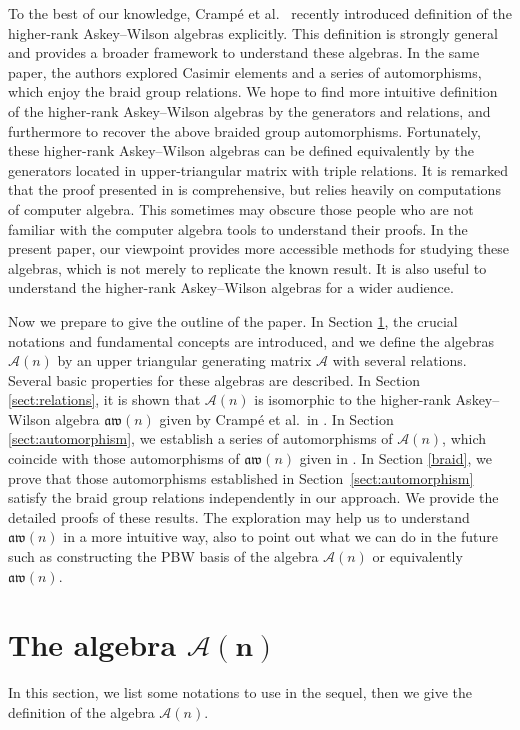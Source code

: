 \documentclass[10pt,a4paper]{amsart}
\numberwithin{equation}{section}
\def\A{\mathscr{A}}
\def\aw{\mathfrak{aw}}
\begin{document}
To the best of our knowledge, Cramp\'{e} et al.\ \cite{CFPR(2023)} recently introduced definition of the higher-rank Askey--Wilson algebras explicitly.
This definition is strongly general and provides a broader framework to understand these algebras.
In the same paper, the authors explored Casimir elements and a series of automorphisms, which enjoy the braid group relations.
We hope to find more intuitive definition of the higher-rank Askey--Wilson algebras by the generators and relations, and furthermore to recover the above braided group automorphisms.
Fortunately, these higher-rank Askey--Wilson algebras can be defined equivalently by the generators located in upper-triangular matrix with triple relations.
It is remarked that the proof presented in \cite{CFPR(2023)} is comprehensive, but relies heavily on computations of computer algebra. This sometimes may obscure those people who are not familiar with the computer algebra tools to understand their proofs.
In the present paper, our viewpoint provides more accessible methods for studying these algebras, which is not merely to replicate the known result.
It is also useful to understand the higher-rank Askey--Wilson algebras for a wider audience.

Now we prepare to give the outline of the paper.
In Section \ref{sect:notations}, the crucial notations and fundamental concepts are introduced, and we define the algebras $\A(n)$ by an upper triangular generating matrix $\A$ with several relations.
Several basic properties for these algebras are described.
In Section \ref{sect:relations}, it is shown that $\A(n)$ is isomorphic to the higher-rank Askey--Wilson algebra $\aw(n)$ given by Cramp\'{e} et al.\ in \cite{CFPR(2023)}.
In Section \ref{sect:automorphism}, we establish a series of automorphisms of $\A(n)$, which coincide with those automorphisms of $\aw(n)$ given in \cite{CFPR(2023)}.
In Section \ref{braid}, we prove that those automorphisms established in Section~\ref{sect:automorphism} satisfy the braid group relations independently in our approach.
We provide the detailed proofs of these results.
The exploration may help us to understand $\aw(n)$ in a more intuitive way, also to point out what we can do in the future such as constructing the PBW basis of the algebra $\A(n)$ or equivalently $\aw(n)$.

\section[The algebra A(n)]{The algebra $\boldsymbol{\A(n)}$}\label{sect:notations}
In this section, we list some notations to use in the sequel, then we give the definition of the algebra $\A(n)$.
\end{document}
